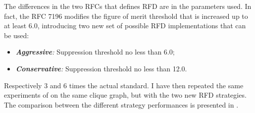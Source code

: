 The differences in the two \acp{RFC} that defines \ac{RFD} \cite{rfc2439,rfc7196}
are in the parameters used.
In fact, the \ac{RFC} \num{7196} modifies the figure
of merit threshold that is increased up to at least \num{6.0}, introducing
two new set of possible \ac{RFD} implementations that can be used:
\begin{itemize}
	\item \textit{\textbf{Aggressive}:} Suppression threshold no less than \num{6.0};
	\item \textit{\textbf{Conservative}:} Suppression threshold no less than \num{12.0}.
\end{itemize}

Respectively \num{3} and \num{6} times the actual standard.
I have then repeated the same experiments of  on the same
clique graph, but with the two new \ac{RFD} strategies.
The comparison between the different strategy performances is presented in .

